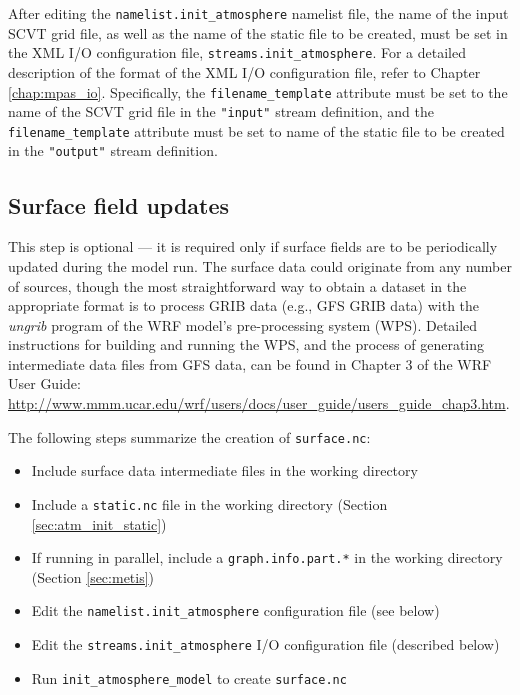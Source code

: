 After editing the {\tt namelist.init\_atmosphere} namelist file, the name of the input SCVT grid file, as well as the name of the static file to be created, must be set in the XML I/O configuration file, {\tt streams.init\_atmosphere}. For a detailed description of the format of the XML I/O configuration file, refer to Chapter \ref{chap:mpas_io}. Specifically, the {\tt filename\_template} attribute must be set to the name of the SCVT grid file in the {\tt "input"} stream definition, and the {\tt filename\_template} attribute must be set to name of the static file to be created in the {\tt "output"} stream definition.


\subsection{Surface field updates}
\label{sec:atm_real_surface}

This step is optional --- it is required only if surface fields are to be periodically updated during the model run.  The surface data could originate from any number of sources, though the most straightforward way to obtain a dataset in the appropriate format is to process GRIB data (e.g., GFS GRIB data) with the {\em ungrib} program of the WRF model's pre-processing system (WPS).  Detailed instructions for building and running the WPS, and the process of generating intermediate data files from GFS data, can be found in Chapter 3 of the WRF User Guide: \url{http://www.mmm.ucar.edu/wrf/users/docs/user\_guide/users\_guide\_chap3.htm}.

The following steps summarize the creation of {\tt surface.nc}:

\begin{itemize}
\item Include surface data intermediate files in the working directory
\item Include a {\tt static.nc} file in the working directory (Section \ref{sec:atm_init_static})
\item If running in parallel, include a {\tt graph.info.part.*} in the working directory (Section \ref{sec:metis})
\item Edit the {\tt namelist.init\_atmosphere} configuration file (see below)
\item Edit the {\tt streams.init\_atmosphere} I/O configuration file (described below)
\item Run {\tt init\_atmosphere\_model} to create {\tt surface.nc}
\end{itemize}


